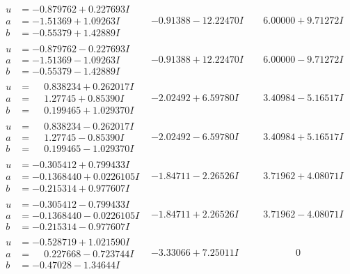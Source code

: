 \documentclass[1p]{elsarticle_modified}
\theoremstyle{definition}
\begin{document}
$$\begin{array}{c|c|c}
\begin{aligned}
u &= -0.879762 + 0.227693 I \\
a &= -1.51369 + 1.09263 I \\
b &= -0.55379 + 1.42889 I\end{aligned}
 & -0.91388 - 12.22470 I & \phantom{-}6.00000 + 9.71272 I \\ \hline\begin{aligned}
u &= -0.879762 - 0.227693 I \\
a &= -1.51369 - 1.09263 I \\
b &= -0.55379 - 1.42889 I\end{aligned}
 & -0.91388 + 12.22470 I & \phantom{-}6.00000 - 9.71272 I \\ \hline\begin{aligned}
u &= \phantom{-}0.838234 + 0.262017 I \\
a &= \phantom{-}1.27745 + 0.85390 I \\
b &= \phantom{-}0.199465 + 1.029370 I\end{aligned}
 & -2.02492 + 6.59780 I & \phantom{-}3.40984 - 5.16517 I \\ \hline\begin{aligned}
u &= \phantom{-}0.838234 - 0.262017 I \\
a &= \phantom{-}1.27745 - 0.85390 I \\
b &= \phantom{-}0.199465 - 1.029370 I\end{aligned}
 & -2.02492 - 6.59780 I & \phantom{-}3.40984 + 5.16517 I \\ \hline\begin{aligned}
u &= -0.305412 + 0.799433 I \\
a &= -0.1368440 + 0.0226105 I \\
b &= -0.215314 + 0.977607 I\end{aligned}
 & -1.84711 - 2.26526 I & \phantom{-}3.71962 + 4.08071 I \\ \hline\begin{aligned}
u &= -0.305412 - 0.799433 I \\
a &= -0.1368440 - 0.0226105 I \\
b &= -0.215314 - 0.977607 I\end{aligned}
 & -1.84711 + 2.26526 I & \phantom{-}3.71962 - 4.08071 I \\ \hline\begin{aligned}
u &= -0.528719 + 1.021590 I \\
a &= \phantom{-}0.227668 - 0.723744 I \\
b &= -0.47028 - 1.34644 I\end{aligned}
 & -3.33066 + 7.25011 I & \phantom{-0.000000 } 0 \\ \hline\begin{aligned}

\end{aligned}
\end{array}$$
\end{document}

